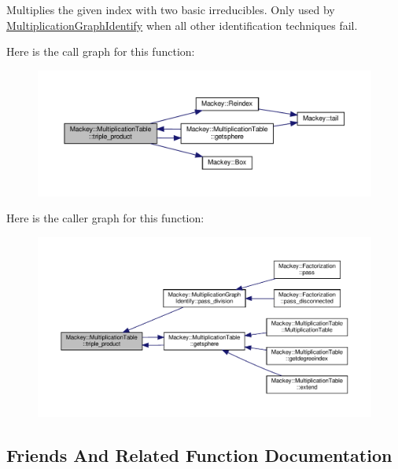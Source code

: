 Multiplies the given index with two basic irreducibles. Only used by \hyperlink{classMackey_1_1MultiplicationGraphIdentify}{Multiplication\+Graph\+Identify} when all other identification techniques fail. 

Here is the call graph for this function\+:\nopagebreak
\begin{figure}[H]
\begin{center}
\leavevmode
\includegraphics[width=350pt]{classMackey_1_1MultiplicationTable_ae2801cd35f426f10c89ab8addb75f829_cgraph}
\end{center}
\end{figure}
Here is the caller graph for this function\+:\nopagebreak
\begin{figure}[H]
\begin{center}
\leavevmode
\includegraphics[width=350pt]{classMackey_1_1MultiplicationTable_ae2801cd35f426f10c89ab8addb75f829_icgraph}
\end{center}
\end{figure}


\subsection{Friends And Related Function Documentation}
\mbox{\label{classMackey_1_1MultiplicationTable_afe48d7818a420930c571f57c9bae006a}} 
